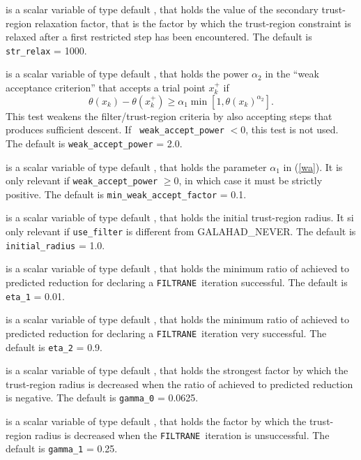 \documentclass{galahad}
\newcommand{\packagename}{FILTRANE}
\newcommand{\sym}{\sf\small}
\newcommand{\filtrane}{{\tt \packagename}}
\begin{document}
\begin{description}
 is a scalar variable of type default \realdp, that holds the
value of the secondary trust-region relaxation factor, that is the factor by
which the trust-region constraint is relaxed after a first restricted step has
been encountered.
The default is {\tt str\_relax} = 1000.

 is a scalar variable of type default \realdp,
that holds the power $\alpha_2$ in the ``weak acceptance criterion'' that
accepts a trial point $x_k^+$ if
\begin{equation}\label{wa}
\theta(x_k)-\theta(x_k^+) \geq
\alpha_1 \min\left[ 1, \theta(x_k)^{\alpha_2} \right].
\end{equation}
This test weakens the filter/trust-region criteria
by also accepting steps that produces sufficient descent.  If {\tt
weak\_accept\_power} $<0$, this test is not used.
The default is {\tt weak\_accept\_power} = 2.0.

 is a scalar variable of type default \realdp,
that holds the parameter $\alpha_1$ in (\ref{wa}).  It is only relevant
if {\tt weak\_accept\_power} $\geq 0$, in which case it must be strictly
positive.
The default is {\tt min\_weak\_accept\_factor} = 0.1.

 is a scalar variable of type default \realdp, that
holds the initial trust-region radius. It si only relevant if
{\tt use\_filter} is different from {\sym GALAHAD\_NEVER}.
The default is {\tt initial\_radius} = 1.0.

 is a scalar variable of type default \realdp, that holds the
minimum ratio of achieved to predicted reduction
for declaring a \filtrane\ iteration successful.
The default is {\tt eta\_1} = 0.01.

 is a scalar variable of type default \realdp, that holds the
minimum ratio of achieved to predicted reduction
for declaring a \filtrane\ iteration very successful.
The default is {\tt eta\_2} = 0.9.

 is a scalar variable of type default \realdp, that holds the
strongest factor by which the trust-region radius is decreased when the ratio
of achieved to predicted reduction is negative.
The default is {\tt gamma\_0} = 0.0625.

 is a scalar variable of type default \realdp, that holds the
factor by which the trust-region radius is decreased when the \filtrane\
iteration is unsuccessful.
The default is {\tt gamma\_1} = 0.25.


\end{description}
\end{document}
